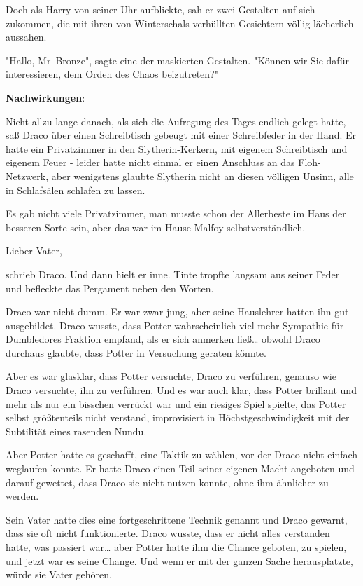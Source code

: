 {Doch als Harry von seiner Uhr aufblickte, sah er zwei Gestalten auf sich zukommen, die mit ihren von Winterschals verhüllten Gesichtern völlig lächerlich aussahen.

"Hallo, Mr~Bronze", sagte eine der maskierten Gestalten. "Können wir Sie dafür interessieren, dem Orden des Chaos beizutreten?"

\textbf{Nachwirkungen}:

Nicht allzu lange danach, als sich die Aufregung des Tages endlich gelegt hatte, saß Draco über einen Schreibtisch gebeugt mit einer Schreibfeder in der Hand. Er hatte ein Privatzimmer in den Slytherin-Kerkern, mit eigenem Schreibtisch und eigenem Feuer - leider hatte nicht einmal er einen Anschluss an das Floh-Netzwerk, aber wenigstens glaubte Slytherin nicht an diesen völligen Unsinn, alle in Schlafsälen schlafen zu lassen.

Es gab nicht viele Privatzimmer, man musste schon der Allerbeste im Haus der besseren Sorte sein, aber das war im Hause Malfoy selbstverständlich.

Lieber Vater,

schrieb Draco. Und dann hielt er inne. Tinte tropfte langsam aus seiner Feder und befleckte das Pergament neben den Worten.

Draco war nicht dumm. Er war zwar jung, aber seine Hauslehrer hatten ihn gut ausgebildet. Draco wusste, dass Potter wahrscheinlich viel mehr Sympathie für Dumbledores Fraktion empfand, als er sich anmerken ließ… obwohl Draco durchaus glaubte, dass Potter in Versuchung geraten könnte.

Aber es war glasklar, dass Potter versuchte, Draco zu verführen, genauso wie Draco versuchte, ihn zu verführen. Und es war auch klar, dass Potter brillant und mehr als nur ein bisschen verrückt war und ein riesiges Spiel spielte, das Potter selbst größtenteils nicht verstand, improvisiert in Höchstgeschwindigkeit mit der Subtilität eines rasenden Nundu.

Aber Potter hatte es geschafft, eine Taktik zu wählen, vor der Draco nicht einfach weglaufen konnte. Er hatte Draco einen Teil seiner eigenen Macht angeboten und darauf gewettet, dass Draco sie nicht nutzen konnte, ohne ihm ähnlicher zu werden.

Sein Vater hatte dies eine fortgeschrittene Technik genannt und Draco gewarnt, dass sie oft nicht funktionierte. Draco wusste, dass er nicht alles verstanden hatte, was passiert war… aber Potter hatte ihm die Chance geboten, zu spielen, und jetzt war es seine Change. Und wenn er mit der ganzen Sache herausplatzte, würde sie Vater gehören.

}
